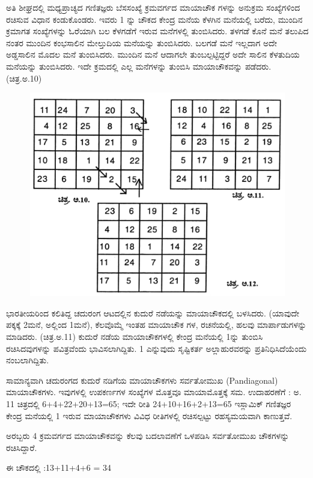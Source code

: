 ಅತಿ ಶೀಘ್ರದಲ್ಲಿ ಮಧ್ಯಪ್ರಾಚ್ಯದ ಗಣಿತಜ್ಞರು ಬೆಸಸಂಖ್ಯೆ ಕ್ರಮವರ್ಗದ ಮಾಯಾಚೌಕ ಗಳನ್ನು ಅನುಕ್ರಮ ಸಂಖ್ಯೆಗಳಿಂದ ರಚಿಸುವ ವಿಧಾನ ಕಂಡುಕೊಂಡರು. ಇವರು 1 ನ್ನು ಚೌಕದ ಕೇಂದ್ರ ಮನೆಯ ಕೆಳಗಿನ ಮನೆಯಲ್ಲಿ ಬರೆದು, ಮುಂದಿನ ಕ್ರಮಾಗತ ಸಂಖ್ಯೆಗಳನ್ನು ಓರೆಯಾಗಿ ಬಲ ಕೆಳಗಡೆಗೆ ಇರುವ ಮನೆಗಳಲ್ಲಿ ತುಂಬಿಸಿದರು. ತಳಗಡೆ ಕೊನೆ ಮನೆ ತಲುಪಿದ ನಂತರ ಮುಂದಿನ ಕಂಭಸಾಲಿನ ಮೇಲ್ತುದಿಯ ಮನೆಯನ್ನು ತುಂಬಿಸಿದರು. ಬಲಗಡೆ ಮನೆ ಇಲ್ಲದಾಗ ಅದೇ ಅಡ್ಡಸಾಲಿನ ಮೊದಲ ಮನೆ ತುಂಬಿಸಿದರು. ಮುಂದಿನ ಮನೆ ಆದಾಗಲೇ ತುಂಬಲ್ಪಟ್ಟಿದ್ದರೆ ಅದೇ ಸಾಲಿನ ಕೆಳತುದಿಯ ಮನೆಯನ್ನು ತುಂಬಿಸಿದರು. ಇದೇ ಕ್ರಮದಲ್ಲಿ ಎಲ್ಲ ಮನೆಗಳನ್ನು ತುಂಬಿಸಿ ಮಾಯಾಚೌಕವನ್ನು ಪಡೆದರು. (ಚಿತ್ರ.ಅ.10)
\begin{figure}[H]
\includegraphics{src/figures/chap9/fig9.8.jpg}
\end{figure}

ಭಾರತೀಯರಿಂದ ಕಲಿತಿದ್ದ ಚದುರಂಗ ಆಟದಲ್ಲಿನ ಕುದುರೆ ನಡೆಯನ್ನು ಮಾಯಾಚೌಕದಲ್ಲಿ ಬಳಸಿದರು. (ಯಾವುದೇ ಪಕ್ಕಕ್ಕೆ 2ಮನೆ, ಅಲ್ಲಿಂದ 1ಮನೆ), ಕೆಲವೊಮ್ಮೆ ಇಂತಹ ಮಾಯಾಚೌಕ ಗಳ, ರಚನೆಯಲ್ಲಿ, ಹಲವು ಮಾರ್ಪಾಡುಗಳನ್ನು ಮಾಡಿದರು. (ಚಿತ್ರ.ಅ.11) ಕುದುರೆ ನಡೆಯ ಮಾಯಾಚೌಕಗಳಲ್ಲಿ ಕೇಂದ್ರ ಮನೆಯಲ್ಲಿ 1ನ್ನು ತುಂಬಿಸಿ ರಚಿಸಿದವುಗಳನ್ನು ಪವಿತ್ರವೆಂದು ಭಾವಿಸಲಾಗಿದ್ದಿತು. 1 ಎನ್ನುವುದು ಸೃಷ್ಟಿಕರ್ತ ಅಲ್ಲಾಹುರವರನ್ನು ಪ್ರತಿನಿಧಿಸಿದೆಯೆಂದು ನಂಬಲಾಗಿದ್ದಿತು.

ಸಾಮಾನ್ಯವಾಗಿ ಚದುರಂಗದ ಕುದುರೆ ನಡಿಗೆಯ ಮಾಯಾಚೌಕಗಳು ಸರ್ವತೋಮುಖ (Pandiagonal) ಮಾಯಾಚೌಕಗಳು. ಇವುಗಳಲ್ಲಿ ಉಪಕರ್ಣಗಳ ಸಂಖ್ಯೆಗಳ ಮೊತ್ತವೂ ಮಾಯಾಮೊತ್ತಕ್ಕೆ ಸಮ. ಉದಾಹರಣೆಗೆ : ಅ. 11 ಚಿತ್ರದಲ್ಲಿ 6+4+22+20+13=65; ಇದೇ ರೀತಿ 24+10+16+2+13=65 ಇಸ್ಲಾಮಿಕ್ ಗಣಿತಜ್ಞರ ಕೇಂದ್ರ ಮನೆಯಲ್ಲಿ 1 ಇರುವ ಮಾಯಾಚೌಕಗಳು ವಿವಿಧ ರೀತಿಗಳಲ್ಲಿ ರಚಿಸಲ್ಪಟ್ಟು ರಹಸ್ಯಮಯವಾಗಿ ಕಾಣುತ್ತವೆ.

ಅರಬ್ಬರು 4 ಕ್ರಮವರ್ಗದ ಮಾಯಾಚೌಕವನ್ನು ಕೆಲವು ಬದಲಾವಣೆಗೆ ಒಳಪಡಿಸಿ ಸರ್ವತೋಮುಖ ಚೌಕಗಳನ್ನು ರಚಿಸಿದ್ದಾರೆ.

ಈ ಚೌಕದಲ್ಲಿ :13+11+4+6 = 34

